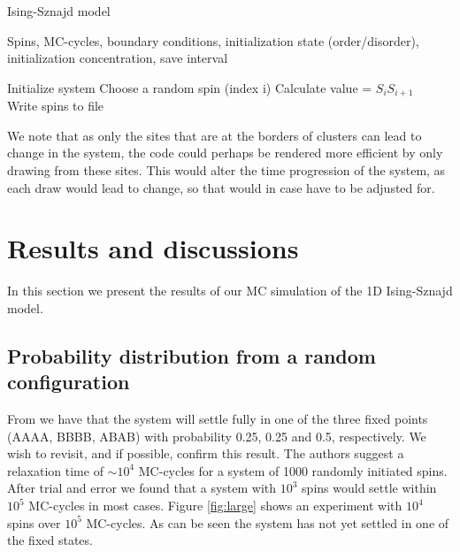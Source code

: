 \documentclass[a4paper]{article}
\begin{document}
\begin{algorithm}[H]
\caption{Ising-Sznajd model }\label{algo-VV}
\begin{algorithmic}[1]
\Require Spins, MC-cycles, boundary conditions, initialization state (order/disorder), initialization concentration, save interval 
\begin{algorithmic}[1]
\State Initialize system
\State Choose a random spin (index i)
\State Calculate value = $S_iS_{i+1}$  \
\EndIf
{} \State Write spins to file
\EndIf
\EndFor
\EndFor
\end{algorithmic}
\end{algorithmic}
\end{algorithm}

\vspace*{1cm}
We note that as only the sites that are at the borders of clusters can lead to change in the system, the code could perhaps be rendered more efficient by only drawing from these sites. This would alter the time progression of the system, as each draw would lead to change, so that would in case have to be adjusted for.


\section{Results and discussions}
In this section we present the results of our MC simulation of the 1D Ising-Sznajd model.

\subsection{Probability distribution from a random configuration}
From \cite{opinion} we have that the system will settle fully in one of the three fixed points (AAAA, BBBB, ABAB) with probability 0.25, 0.25 and 0.5, respectively. We wish to revisit, and if possible, confirm this result. The authors suggest a relaxation time of $\sim 10^4$ MC-cycles for a system of 1000 randomly initiated spins. After trial and error we found that a system with $10^3$ spins would settle within $10^5$ MC-cycles in most cases. Figure \ref{fig:large} shows an experiment with $10^4$ spins over $10^5$ MC-cycles. As can be seen the system has not yet settled in one of the fixed states.
\end{document}
